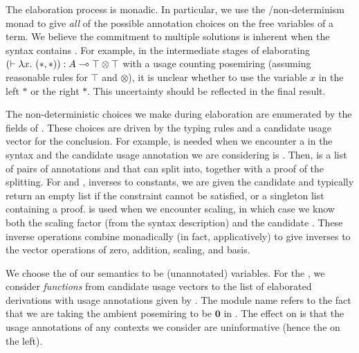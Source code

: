 
The elaboration process is monadic.
In particular, we use the /non-determinism monad to give
\emph{all} of the possible annotation choices on the free variables of a term.
We believe the commitment to multiple solutions is inherent when the syntax
contains .
For example, in the intermediate stages of elaborating
$\plr{\vdash \lambda x.~\plr{*,*}} : A \multimap \top \otimes \top$ with a
usage counting posemiring (assuming reasonable rules for $\top$ and $\otimes$),
it is unclear whether to use the variable $x$ in the left $*$ or the right $*$.
This uncertainty should be reflected in the final result.

The non-deterministic choices we make during elaboration are enumerated by
the fields of .
These choices are driven by the typing rules and a candidate usage vector for
the conclusion.
For example, \AgdaSpace{} is needed when we
encounter a  in the syntax and the candidate
usage annotation we are considering is .
Then, \AgdaSpace{} is a list of pairs of
annotations  and  that  can split into,
together with a proof of the splitting.
For  and , inverses to constants,
we are given the candidate  and typically return an empty list if
the constraint cannot be satisfied, or a singleton list containing a proof.
 is used when we encounter scaling, in which case we know
both the scaling factor  (from the syntax description) and the
candidate .
These inverse operations combine monadically (in fact, applicatively) to give
inverses to the vector operations of zero, addition, scaling, and basis.


We choose the \AgdaBound{$\V$} of our semantics to be (unannotated) variables.
For the \AgdaBound{$\C$}, we consider \emph{functions} from candidate usage
vectors  to the list of elaborated derivations with usage
annotations given by .
The module name  refers to the fact that we are taking the
ambient posemiring to be $\mathbf0$ in .
The effect on  is that the usage annotations of any
contexts we consider are uninformative (hence the \AgdaSymbol{\_} on the left).


